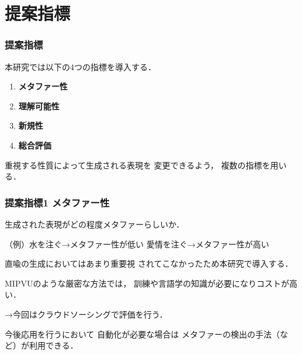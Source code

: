 \documentclass[12pt,usepdftitle=false]{beamer}
\begin{document}
%
%
%
%
%
%
%
%
%

\section{提案指標}
\begin{frame}
    \frametitle{提案指標}
    本研究では以下の4つの指標を導入する．

     \begin{enumerate}
         \item \textbf{メタファー性}

         \item \textbf{理解可能性}

         \item \textbf{新規性}

         \item \textbf{総合評価}

     \end{enumerate}

     \bigskip

     重視する性質によって生成される表現を
     変更できるよう，
     複数の指標を用いる．
\end{frame}

\begin{frame}
    \frametitle{提案指標1 メタファー性}
    生成された表現がどの程度メタファーらしいか．

    （例）水を注ぐ→メタファー性が低い\newline
     \phantom{（例）}\hspace{0.5\zw}愛情を注ぐ→メタファー性が高い

     \bigskip

    直喩の生成においてはあまり重要視
    されてこなかったため本研究で導入する．

	\bigskip

	MIPVUのような厳密な方法では，
	訓練や言語学の知識が必要になりコストが高い．

	→今回はクラウドソーシングで評価を行う．

	\bigskip

	今後応用を行うにおいて
    自動化が必要な場合は
    メタファーの検出の手法（\citet{shutova2011}など）が利用できる．

\end{frame}
\end{document}
